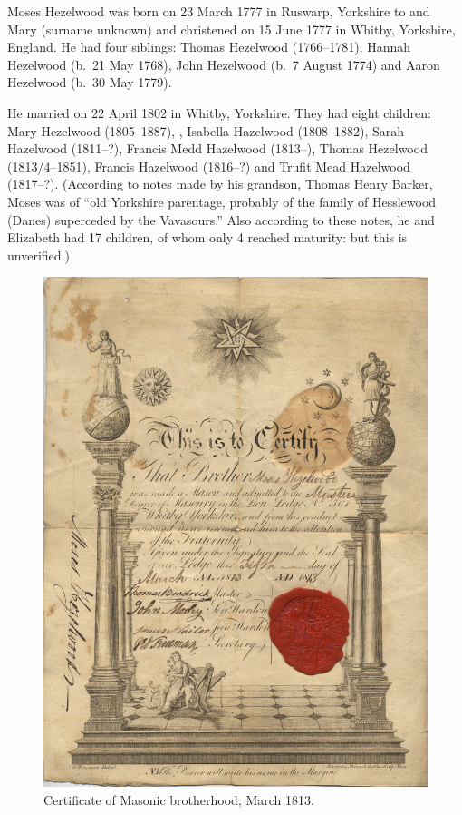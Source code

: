 
Moses Hezelwood was born on 23 March 1777 in Ruswarp, Yorkshire to  and Mary (surname unknown) and christened on 15 June 1777 in Whitby, Yorkshire, England.\cite{MHezelwoodBirth} He had four siblings: Thomas Hezelwood (1766--1781), Hannah Hezelwood (b.\ 21 May 1768), John Hezelwood (b.\ 7 August 1774) and Aaron Hezelwood (b.\ 30 May 1779).

He married  on 22 April 1802 in	Whitby, Yorkshire.\cite{MHezelwoodMarriage}  They had eight children: Mary Hezelwood (1805--1887), , Isabella Hazelwood (1808--1882), Sarah Hazelwood (1811--?), Francis Medd Hazelwood (1813--), Thomas Hezelwood (1813/4--1851), Francis Hazelwood (1816--?) and Trufit Mead Hazelwood (1817--?). (According to notes made by his grandson, Thomas Henry Barker, Moses  was of ``old Yorkshire parentage, probably of the family of Hesslewood (Danes) superceded by the Vavasours.'' Also according to these notes, he and Elizabeth had 17 children, of whom only 4 reached maturity: but this is unverified.)

\begin{figure}
 \centering
 \includegraphics{sources/MosesHezelwoord_MasonicCert_1813.png}
 \caption{Certificate of Masonic brotherhood, March 1813.}
\end{figure}

